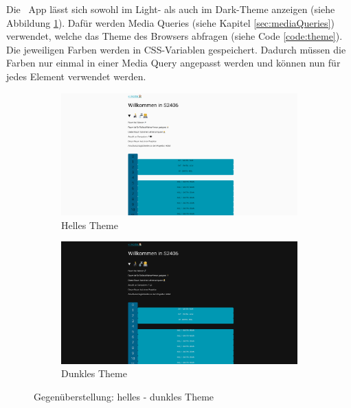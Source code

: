
Die \ZELIA\ App lässt sich sowohl im Light- als auch im Dark-Theme anzeigen (siehe Abbildung \ref{fig:theme}). Dafür werden Media Queries (siehe Kapitel \ref{sec:mediaQueries}) verwendet, welche das Theme des Browsers abfragen (siehe Code \ref{code:theme}). 
Die jeweiligen Farben werden in CSS-Variablen gespeichert. Dadurch müssen die Farben nur einmal in einer Media Query angepasst werden und können nun für jedes Element verwendet werden. 

\begin{figure}[H]
    \begin{subfigure}[c]{0.49\textwidth}
        \centering
        \includegraphics[width=\textwidth]{media/ResponsiveDesign/ZeliaDesktop.png}
        \caption{Helles Theme}
    \end{subfigure} \hfill
    \begin{subfigure}[c]{0.49\textwidth}
        \centering
        \includegraphics[width=\textwidth]{media/ResponsiveDesign/ZeliaDesktopDark.png}
        \caption{Dunkles Theme}
    \end{subfigure}
    \caption{Gegenüberstellung: helles - dunkles Theme}
    \label{fig:theme}
\end{figure}

